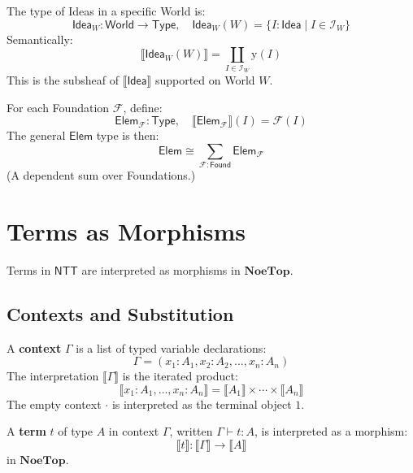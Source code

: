 \begin{example}
\label{ex:world-idea-type}
The type of Ideas in a specific World is:
\[
  \mathsf{Idea}_W : \mathsf{World} \to \mathsf{Type}, \quad
  \mathsf{Idea}_W(W) = \{I : \mathsf{Idea} \mid I \in \mathcal{I}_W\}
\]
Semantically:
\[
  \llbracket \mathsf{Idea}_W(W) \rrbracket = \coprod_{I \in \mathcal{I}_W} \mathrm{y}(I)
\]
This is the subsheaf of $\llbracket \mathsf{Idea} \rrbracket$ supported on World $W$.
\end{example}

\begin{example}
\label{ex:foundation-element-type}
For each Foundation $\mathcal{F}$, define:
\[
  \mathsf{Elem}_{\mathcal{F}} : \mathsf{Type}, \quad
  \llbracket \mathsf{Elem}_{\mathcal{F}} \rrbracket(I) = \mathcal{F}(I)
\]
The general $\mathsf{Elem}$ type is then:
\[
  \mathsf{Elem} \cong \sum_{\mathcal{F} : \mathsf{Found}} \mathsf{Elem}_{\mathcal{F}}
\]
(A dependent sum over Foundations.)
\end{example}

\section{Terms as Morphisms}
\label{sec:terms-as-morphisms}

Terms in $\mathsf{NTT}$ are interpreted as morphisms in $\mathbf{NoeTop}$.

\subsection{Contexts and Substitution}
\label{subsec:contexts-substitution}

\begin{definition}[Context]
\label{def:context}
A \textbf{context} $\Gamma$ is a list of typed variable declarations:
\[
  \Gamma = (x_1 : A_1, x_2 : A_2, \ldots, x_n : A_n)
\]
The interpretation $\llbracket \Gamma \rrbracket$ is the iterated product:
\[
  \llbracket x_1 : A_1, \ldots, x_n : A_n \rrbracket =
  \llbracket A_1 \rrbracket \times \cdots \times \llbracket A_n \rrbracket
\]
The empty context $\cdot$ is interpreted as the terminal object $1$.
\end{definition}

\begin{definition}
\label{def:term-interpretation}
A \textbf{term} $t$ of type $A$ in context $\Gamma$, written $\Gamma \vdash t : A$,
is interpreted as a morphism:
\[
  \llbracket t \rrbracket : \llbracket \Gamma \rrbracket \to \llbracket A \rrbracket
\]
in $\mathbf{NoeTop}$.
\end{definition}

